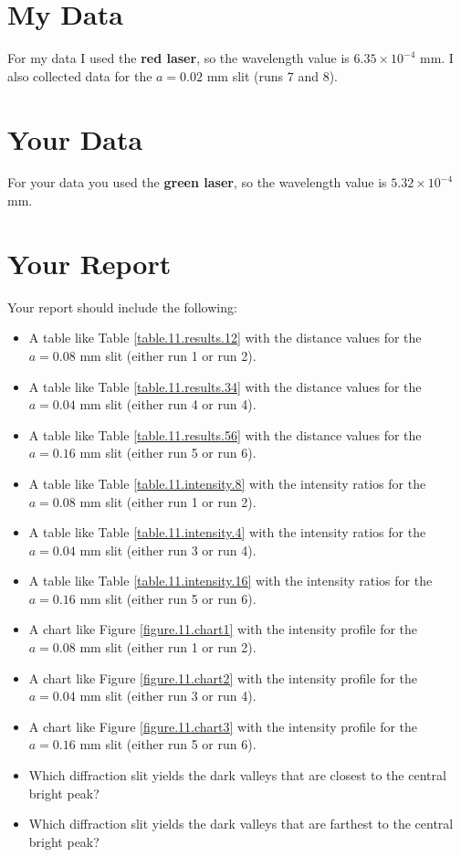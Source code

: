 \section{My Data}
For my data I used the \textbf{red laser}, so the wavelength value is $6.35 \times 10^{-4}$ mm. I also collected data for the $a = 0.02$ mm slit (runs 7 and 8).
\section{Your Data}
For your data you used the \textbf{green laser}, so the wavelength value is $5.32 \times 10^{-4}$ mm.
\newpage
\section{Your Report}
Your report should include the following:
\begin{itemize}
    \item A table like Table \ref{table.11.results.12} with the distance values for the $a = 0.08$ mm slit (either run 1 or run 2).
    \item A table like Table \ref{table.11.results.34} with the distance values for the $a = 0.04$ mm slit (either run 4 or run 4).
    \item A table like Table \ref{table.11.results.56} with the distance values for the $a = 0.16$ mm slit (either run 5 or run 6).
    \item A table like Table \ref{table.11.intensity.8} with the intensity ratios for the $a = 0.08$ mm slit (either run 1 or run 2).
    \item A table like Table \ref{table.11.intensity.4} with the intensity ratios for the $a = 0.04$ mm slit (either run 3 or run 4).
    \item A table like Table \ref{table.11.intensity.16} with the intensity ratios for the $a = 0.16$ mm slit (either run 5 or run 6).
    \item A chart like Figure \ref{figure.11.chart1} with the intensity profile for the $a = 0.08$ mm slit (either run 1 or run 2).
    \item A chart like Figure \ref{figure.11.chart2} with the intensity profile for the $a = 0.04$ mm slit (either run 3 or run 4).
    \item A chart like Figure \ref{figure.11.chart3} with the intensity profile for the $a = 0.16$ mm slit (either run 5 or run 6).
    \item Which diffraction slit yields the dark valleys that are closest to the central bright peak?
    \item Which diffraction slit yields the dark valleys that are farthest to the central bright peak?
\end{itemize}
\newpage
